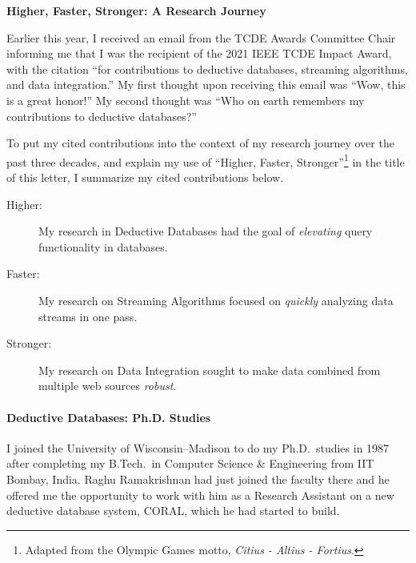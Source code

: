 \documentclass[11pt]{article}
\begin{document}
\textbf{\Large Higher, Faster, Stronger: A Research Journey}
\newline


Earlier this year, I received an email from the TCDE Awards
Committee Chair informing me that I was the recipient of the 2021 IEEE
TCDE Impact Award, with the citation 
``for contributions to deductive databases, streaming algorithms, and 
data integration.''
My first thought upon receiving this email was ``Wow, this is a great honor!''
My second thought was ``Who on earth remembers my contributions to 
deductive databases?''

To put my cited contributions into the context of my research journey over
the past three decades, and explain my use of ``Higher, Faster, 
Stronger''\footnote{Adapted from the Olympic Games motto, \emph{Citius - 
Altius - Fortius}.} in the title of this letter, I summarize my cited
contributions below.

\begin{description}
\item [Higher:] 
My research in Deductive Databases had the goal of \emph{elevating} 
query functionality in databases.

\item [Faster:]
My research on Streaming Algorithms focused on \emph{quickly} 
analyzing data streams in one pass.

\item [Stronger:]
My research on Data Integration sought to make data combined from 
multiple web sources \emph{robust}.

\end{description}

\paragraph{Deductive Databases: Ph.D. Studies}
I joined the University of Wisconsin--Madison to do my Ph.D.\ studies in 
1987 after completing my B.Tech.\ in Computer Science \& Engineering from 
IIT Bombay, India.
Raghu Ramakrishnan had just joined the faculty there and he offered me 
the opportunity to work with him as a Research Assistant on a new 
deductive database system, CORAL, which he had started to build.
\end{document}
